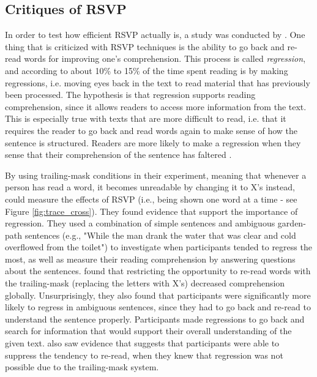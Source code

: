 \subsection{Critiques of RSVP}
In order to test how efficient RSVP actually is, a study was conducted by . One thing that is criticized with RSVP techniques is the ability to go back and re-read words for improving one's comprehension. This process is called \textit{regression}, and according to \citeauthor{schotter_dont_2014} about 10\% to 15\% of the time spent reading is by making regressions, i.e. moving eyes back in the text to read material that has previously been processed. The hypothesis is that regression supports reading comprehension, since it allows readers to access more information from the text. This is especially true with texts that are more difficult to read, i.e. that it requires the reader to go back and read words again to make sense of how the sentence is structured. Readers are more likely to make a regression when they sense that their comprehension of the sentence has faltered \cite{schotter_dont_2014}.

By using trailing-mask conditions in their experiment, meaning that whenever a person has read a word, it becomes unreadable by changing it to X's instead,  could measure the effects of RSVP (i.e., being shown one word at a time - see Figure \ref{fig:trace_cross}). They found evidence that support the importance of regression. They used a combination of simple sentences and ambiguous garden-path sentences (e.g., "While
the man drank the water that was clear and cold overflowed from the toilet") to investigate when participants tended to regress the most, as well as measure their reading comprehension by answering questions about the sentences. \citeauthor{schotter_dont_2014} found that restricting the opportunity to re-read words with the trailing-mask (replacing the letters with X's) decreased comprehension globally. Unsurprisingly, they also found that participants were significantly more likely to regress in ambiguous sentences, since they had to go back and re-read to understand the sentence properly. Participants made regressions to go back and search for information that would support their overall understanding of the given text. \citeauthor{schotter_dont_2014} also saw evidence that suggests that participants were able to suppress the tendency to re-read, when they knew that regression was not possible due to the trailing-mask system.


